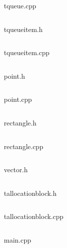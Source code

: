 \documentclass[12pt]{article}
\begin{document}
{\Huge tqueue.cpp}
\inputminted{C++}{tqueue.inl}
\pagebreak

{\Huge tqueueitem.h}
\inputminted{C++}{tqueueitem.h}
\pagebreak

{\Huge tqueueitem.cpp}
\inputminted{C++}{tqueueitem.inl}
\pagebreak
    
{\Huge point.h}
\inputminted{C++}{point.h}
    \pagebreak

{\Huge point.cpp}
\inputminted{C++}{point.cpp}
    \pagebreak

{\Huge rectangle.h}
\inputminted{C++}{rectangle.h}
\pagebreak

{\Huge rectangle.cpp}
\inputminted{C++}{rectangle.cpp}
\pagebreak

{\Huge vector.h}
\inputminted{C++}{vector.h}
\pagebreak

{\Huge tallocationblock.h}
\inputminted{C++}{tallocationblock.h}
\pagebreak

{\Huge tallocationblock.cpp}
\inputminted{C++}{tallocationblock.cpp}
\pagebreak

{\Huge main.cpp}
\inputminted{C++}{main.cpp}
    \pagebreak
    
\end{document}
